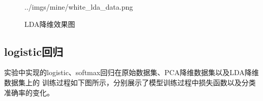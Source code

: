 \documentclass[notitlepage]{article}
\begin{document}
\begin{figure}[htbp]
{    {../imgs/mine/white_lda_data.png}}\hspace{3pt}
	\caption{LDA降维效果图}
\end{figure}

\subsection{logistic回归}

实验中实现的logistic、softmax回归在原始数据集、PCA降维数据集以及LDA降维数据集上的
训练过程如下图所示，分别展示了模型训练过程中损失函数以及分类准确率的变化。
\end{document}
